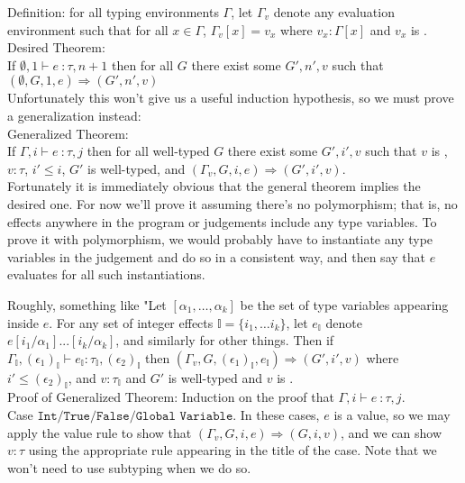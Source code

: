 \documentclass{article}
\begin{document}
\noindent Definition: for all typing environments $\Gamma$, let $\Gamma_v$ denote any evaluation environment such that for all $x \in \Gamma$, $\Gamma_v[x] = v_x$ where $v_x : \Gamma[x]$ and $v_x$ is \okvalue.
\\

\noindent Desired Theorem: \\\indent If $\emptyset, 1 \vdash e\ \colon \tau, n+1 $ then for all $G$ there exist some $G', n', v$ such that $(\emptyset, G, 1, e) \Rightarrow (G', n', v)$
\\

\noindent Unfortunately this won't give us a useful induction hypothesis, so we must prove a generalization instead:
\\

\noindent Generalized Theorem: \\\indent If $\Gamma, i \vdash e\ \colon \tau, j$ then for all well-typed $G$ there exist some $G', i', v$ such that $v$ is \okvalue, $v : \tau$, $i' \leq i$, $G'$ is well-typed, and $(\Gamma_v, G, i, e) \Rightarrow (G', i', v)$.
\\

\noindent Fortunately it is immediately obvious that the general theorem implies the desired one. For now we'll prove it assuming there's no polymorphism; that is, no effects anywhere in the program or judgements include any type variables. To prove it with polymorphism, we would probably have to instantiate any type variables in the judgement and do so in a consistent way, and then say that $e$ evaluates for all such instantiations. 

Roughly, something like "Let $[\alpha_1, \dots, \alpha_k]$ be the set of type variables appearing inside $e$. For any set of integer effects $\mathbb{I} = \{i_1, \dots i_k\}$, let $e_\mathbb{I}$ denote $e[i_1/\alpha_1]...[i_k/\alpha_k]$, and similarly for other things. Then if $\Gamma_\mathbb{I}, (\epsilon_1)_\mathbb{I} \vdash e_\mathbb{I} : \tau_\mathbb{I}, (\epsilon_2)_\mathbb{I}$ then $(\Gamma_v, G, (\epsilon_1)_\mathbb{I}, e_\mathbb{I}) \Rightarrow (G', i', v)$ where $i' \leq (\epsilon_2)_\mathbb{I}$, and $v : \tau_\mathbb{I}$ and $G'$ is well-typed and $v$ is \okvalue.
\\

\noindent Proof of Generalized Theorem: Induction on the proof that $\Gamma, i \vdash e\ \colon \tau, j$.
\\

Case $\texttt{Int/True/False/Global Variable}$. In these cases, $e$ is a value, so we may apply the value rule to show that $(\Gamma_v, G, i, e) \Rightarrow (G, i, v)$, and we can show $v : \tau$ using the appropriate rule appearing in the title of the case. Note that we won't need to use subtyping when we do so.
\\
\end{document}
